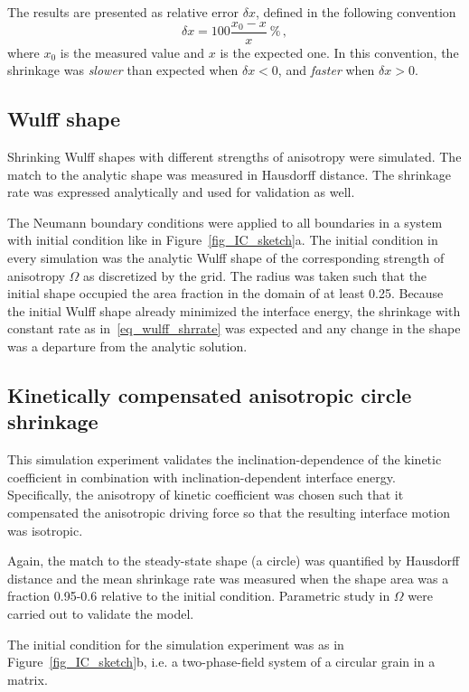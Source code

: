 The results are presented as relative error $\delta x$, defined in the following convention
\begin{equation}
	\delta x = 100 \frac{x_0-x}{x}~\%\,,
\end{equation}
where $x_0$ is the measured value and $x$ is the expected one. In this convention, the shrinkage was \textit{slower} than expected when $\delta x<0$, and \textit{faster} when $\delta x > 0$.

\subsection{Wulff shape}

Shrinking Wulff shapes with different strengths of anisotropy were simulated. The match to the analytic shape was measured in Hausdorff distance. The shrinkage rate was expressed analytically and used for validation as well.

The Neumann boundary conditions were applied to all boundaries in a system with initial condition like in Figure~\ref{fig_IC_sketch}a. The initial condition in every simulation was the analytic Wulff shape of the corresponding strength of anisotropy $\Omega$ as discretized by the grid. The radius was taken such that the initial shape occupied the area fraction in the domain of at least 0.25. Because the initial Wulff shape already minimized the interface energy, the shrinkage with constant rate as in~\eqref{eq_wulff_shrrate} was expected and any change in the shape was a departure from the analytic solution. 

\subsection{Kinetically compensated anisotropic circle shrinkage}
This simulation experiment validates the inclination-dependence of the kinetic coefficient in combination with inclination-dependent interface energy. 
Specifically, the anisotropy of kinetic coefficient was chosen such that it compensated the anisotropic driving force so that the resulting interface motion was isotropic. 

Again, the match to the steady-state shape (a circle) was quantified by Hausdorff distance and the mean shrinkage rate was measured when the shape area was a fraction 0.95-0.6 relative to the initial condition. Parametric study in $\Omega$ were carried out to validate the model.

The initial condition for the simulation experiment was as in Figure~\ref{fig_IC_sketch}b, i.e. a two-phase-field system of a circular grain in a matrix.  

